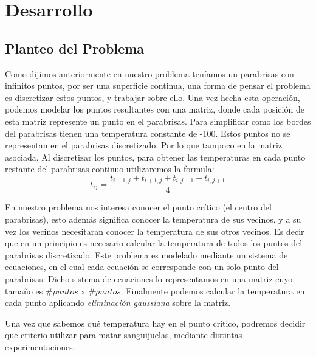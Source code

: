 \section{Desarrollo}

\subsection{Planteo del Problema}
Como dijimos anteriormente en nuestro problema teníamos un parabrisas con infinitos puntos, por ser una superficie continua, una forma de pensar el problema es discretizar estos puntos, y trabajar sobre ello. Una vez hecha esta operación, podemos modelar los puntos resultantes con una matriz, donde cada posición de esta matriz represente un punto en el parabrisas. Para simplificar como los bordes del parabrisas tienen una temperatura constante de -100. Estos puntos no se representan en el parabrisas discretizado. Por lo que tampoco en la matriz asociada. \newline
Al discretizar los puntos, para obtener las temperaturas en cada punto restante del parabrisas continuo utilizaremos la formula:
$$
t_{ij} = \frac{t_{i-1,j} + t_{i+1,j} + t_{i,j-1} + t_{i,j+1}}{4}
$$

En nuestro problema nos interesa conocer el punto crítico (el centro del parabrisas), esto además significa conocer la temperatura de sus vecinos, y a su vez los vecinos necesitaran conocer la temperatura de sus otros vecinos.
Es decir que en un principio es necesario calcular la temperatura de todos los puntos del parabrisas discretizado.
Este problema es modelado mediante un sistema de ecuaciones, en el cual cada ecuación se corresponde con un solo punto del parabrisas. Dicho sistema de ecuaciones lo representamos en una matriz cuyo tamaño es $\#puntos$ x $\#puntos$. Finalmente podemos calcular la temperatura en cada punto aplicando \textit{eliminación gaussiana} sobre la matriz.

Una vez que sabemos qué temperatura hay en el punto crítico, podremos decidir que criterio utilizar para matar sanguijuelas, mediante distintas experimentaciones.


